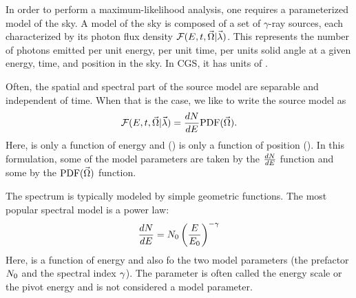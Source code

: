 
In order to perform a maximum-likelihood analysis, one requires
a parameterized model of the sky. A model of the sky
is composed of a set of $\gamma$-ray sources,
each characterized by its photon flux density 
  $\mathcal{F}(E,t,\vec\Omega|\vec\lambda)$.
This represents
the number of photons emitted per unit energy, per unit
time, per units solid angle
at a given energy, time, and position in the sky.
In \ac{CGS}, it has units of \fluxdensityunits.

Often, the spatial and spectral part of the source model
are separable and independent of time. When that is the case,
we like to write the source model as
\begin{equation}
  \mathcal{F}(E,t,\vec\Omega|\vec\lambda) = \frac{dN}{dE} \text{PDF}(\vec\Omega).
\end{equation}
Here, \dnde is only a function of energy and \pdf(\solidangle) is only
a function of position (\solidangle).  In this formulation, some of the
model parameters \modelparams are taken by the $\frac{dN}{dE}$ function and some
by the $\text{PDF}(\vec\Omega)$ function.

The spectrum \dnde is typically modeled by simple geometric functions.
The most popular spectral model is a power law:
  \begin{equation}
    \frac{dN}{dE} = N_0 \left(\frac{E}{E_0}\right)^{-\gamma}
  \end{equation}
Here, \dnde is a function of energy and also fo the two model parameters
(the prefactor $N_0$ and the spectral index $\gamma$). The
parameter \energyscale is often called the energy scale or the pivot
energy and is not considered a model parameter.

